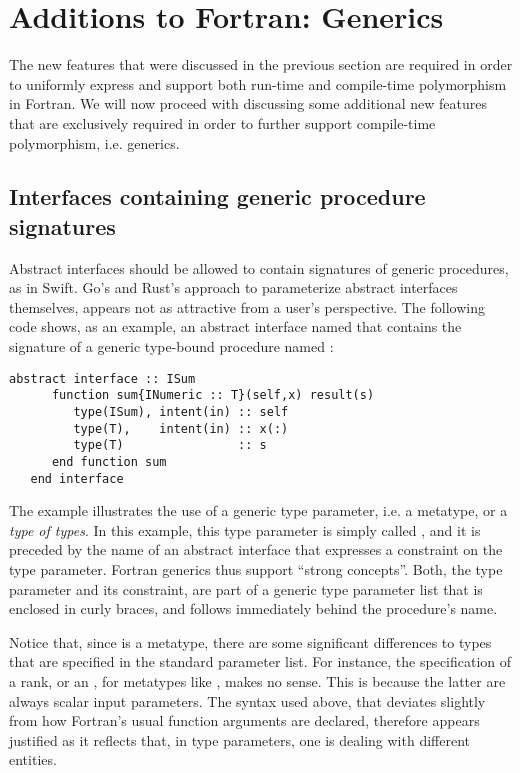 \documentclass[11pt,oneside]{article}
\newcommand{\code}[1]{{\selectfont\ttfamily{#1}}}
\begin{document}
\newpage

\section{Additions to Fortran: Generics}

The new features that were discussed in the previous section are
required in order to uniformly express and support both run-time and
compile-time polymorphism in Fortran. We will now proceed with
discussing some additional new features that are exclusively required
in order to further support compile-time polymorphism, i.e. generics.

\subsection{Interfaces containing generic procedure signatures}
\label{sect:generic_interfaces}

Abstract interfaces should be allowed to contain signatures of generic
procedures, as in Swift. Go's and Rust's approach to parameterize
abstract interfaces themselves, appears not as attractive from a
user's perspective. The following code shows, as an example, an
abstract interface named \code{ISum} that contains the signature of a
generic type-bound procedure named \code{sum}:
\begin{lstlisting}[language=LFortran,style=boxed]
   abstract interface :: ISum
      function sum{INumeric :: T}(self,x) result(s)
         type(ISum), intent(in) :: self
         type(T),    intent(in) :: x(:)
         type(T)                :: s
      end function sum
   end interface
\end{lstlisting}

The example illustrates the use of a generic type parameter, i.e.  a
metatype, or a \emph{type of types}. In this example, this type
parameter is simply called \code{T}, and it is preceded by the name of
an abstract interface that expresses a constraint on the type
parameter. Fortran generics thus support ``strong concepts''. Both,
the type parameter and its constraint, are part of a generic type
parameter list that is enclosed in curly braces, and follows
immediately behind the procedure's name.


Notice that, since \code{T} is a metatype, there are some significant
differences to types that are specified in the standard parameter
list. For instance, the specification of a rank, or an \code{intent},
for metatypes like \code{T}, makes no sense. This is because the
latter are always scalar input parameters. The syntax used above,
that deviates slightly from how Fortran's usual function arguments are
declared, therefore appears justified as it reflects that, in type
parameters, one is dealing with different entities.
\end{document}
